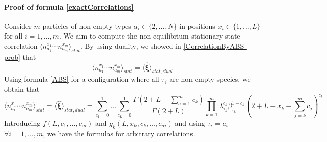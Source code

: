 \documentclass[10pt]{article}
\numberwithin{equation}{section}
\numberwithin{equation}{subsection}
\begin{document}
\paragraph{Proof of formula \eqref{exactCorrelations}} Consider $m$ particles of non-empty types $a_{i}\in\{2,\ldots,N\}$ in positions $x_{i}\in\{1,\ldots,L\}$ for all $i=1,\ldots,m$. We aim to compute the non-equilibrium stationary state correlation $\langle n_{a_{1}}^{x_{1}}\cdots n_{a_{m}}^{x_{m}} \rangle_{stat}$. By using duality, we showed in \eqref{CorrelationByABS-prob} that
 \begin{equation}
 	\langle n_{a_{1}}^{x_{1}}\cdots n_{a_{m}}^{x_{m}} \rangle_{stat}=\langle\hat{\bm{\xi}}\rangle_{stat,dual}
 \end{equation} 
Using formula \eqref{ABS} for a configuration where all $\tau_{i}$ are non-empty species, we obtain that 
\begin{equation}
	\langle n_{a_{1}}^{x_{1}}\cdots n_{a_{m}}^{x_{m}} \rangle_{stat}=\langle\hat{\bm{\xi}}\rangle_{stat,dual}=\sum_{c_{1}=0}^{1}\ldots\sum_{c_{L}=0}^{1}\frac{\Gamma(2+L-\sum_{a=1}^{m}c_{k})}{\Gamma(2+L)}\prod_{k=1}^{m}\lambda_{\tau_{k}}^{c_{k}}\beta_{\tau_{k}}^{1-c_{k}}\left(2+L-x_{k}-\sum_{j=k}^{m}c_{j}\right)^{c_{k}}
\end{equation}
Introducing $f(L,c_{1},\ldots,c_{m})$ and $g_{k}(L,x_{k},c_{k},\ldots,c_{m})$ and using $\tau_{i}=a_{i}$ $\forall i=1,\ldots,m$, we have the formulas for arbitrary correlations.
\end{document}
